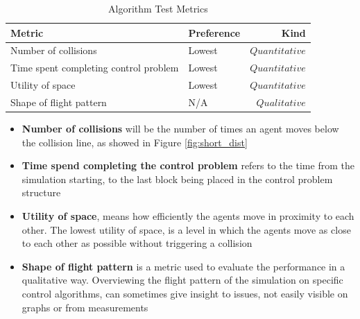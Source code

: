 \begin{table}[H]
\centering
\begin{tabularx}{1\textwidth}{l@{ }Xr}
\toprule
\textbf{Metric} &\textbf{Preference} & \textbf{Kind} \\ \midrule
Number of collisions  & Lowest & ${Quantitative}$  \\
Time spent completing control problem & Lowest & ${Quantitative}$  \\
Utility of space & Lowest & ${Quantitative}$  \\
Shape of flight pattern  & N/A & ${Qualitative}$  \\
\bottomrule
\end{tabularx}
\caption{Algorithm Test Metrics}
\label{tab:test_metrics}
\end{table}

\begin{itemize}
\item{\textbf{Number of collisions} will be the number of times an agent moves below the collision line, as showed in Figure \ref{fig:short_dist}}
\item{\textbf{Time spend completing the control problem} refers to the time from the simulation starting, to the last block being placed in the control problem structure}
\item{\textbf{Utility of space}, means how efficiently the agents move in proximity to each other. The lowest utility of space, is a level in which the agents move as close to each other as possible without triggering a collision}
\item{\textbf{Shape of flight pattern} is a metric used to evaluate the performance in a qualitative way. Overviewing the flight pattern of the simulation on specific control algorithms, can sometimes give insight to issues, not easily visible on graphs or from measurements}
\end{itemize}

